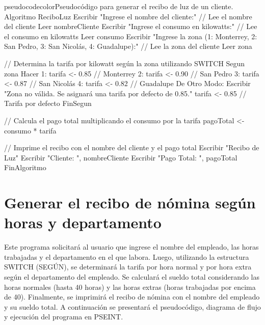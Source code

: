 \documentclass[
	spanish, %
	letterpaper, oneside
]{article}
\begin{document}
\begin{sourcecode}{pseudocodecolor}{Pseudocódigo para generar el recibo de luz de un cliente.}
Algoritmo ReciboLuz
    Escribir "Ingrese el nombre del cliente:"
    // Lee el nombre del cliente
    Leer nombreCliente
    Escribir "Ingrese el consumo en kilowatts:"
    // Lee el consumo en kilowatts
    Leer consumo
    Escribir "Ingrese la zona (1: Monterrey, 2: San Pedro, 3: San Nicolás, 4: Guadalupe):"
    // Lee la zona del cliente
    Leer zona
    
    // Determina la tarifa por kilowatt según la zona utilizando SWITCH
    Segun zona Hacer
        1: tarifa <- 0.85 // Monterrey
        2: tarifa <- 0.90 // San Pedro
        3: tarifa <- 0.87 // San Nicolás
        4: tarifa <- 0.82 // Guadalupe
        De Otro Modo:
            Escribir "Zona no válida. Se asignará una tarifa por defecto de 0.85."
            tarifa <- 0.85 // Tarifa por defecto
    FinSegun
    
    // Calcula el pago total multiplicando el consumo por la tarifa
    pagoTotal <- consumo * tarifa
    
    // Imprime el recibo con el nombre del cliente y el pago total
    Escribir "Recibo de Luz"
    Escribir "Cliente: ", nombreCliente
    Escribir "Pago Total: ", pagoTotal
FinAlgoritmo
\end{sourcecode}



\section{Generar el recibo de nómina según horas y departamento}

Este programa solicitará al usuario que ingrese el nombre del empleado, las horas trabajadas y el departamento en el que labora. Luego, utilizando la estructura SWITCH (SEGÚN), se determinará la tarifa por hora normal y por hora extra según el departamento del empleado. Se calculará el sueldo total considerando las horas normales (hasta 40 horas) y las horas extras (horas trabajadas por encima de 40). Finalmente, se imprimirá el recibo de nómina con el nombre del empleado y su sueldo total. A continuación se presentará el pseudocódigo, diagrama de flujo y ejecución del programa en PSEINT.
\end{document}
